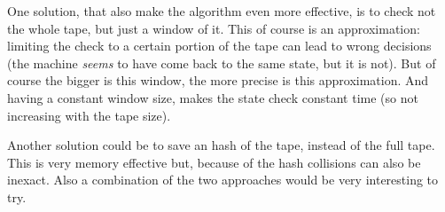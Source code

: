 \documentclass{report}
\begin{document}
One solution, that also make the algorithm even more effective, is to check not the whole tape, but just a window of it. This of course is an approximation: limiting the check to a certain portion of the tape can lead to wrong decisions (the machine \textit{seems} to have come back to the same state, but it is not).
But of course the bigger is this window, the more precise is this approximation. And having a constant window size, makes the state check constant time (so not increasing with the tape size).

Another solution could be to save an hash of the tape, instead of the full tape. This is very memory effective but, because of the hash collisions can also be inexact. Also a combination of the two approaches would be very interesting to try.




\end{document}

